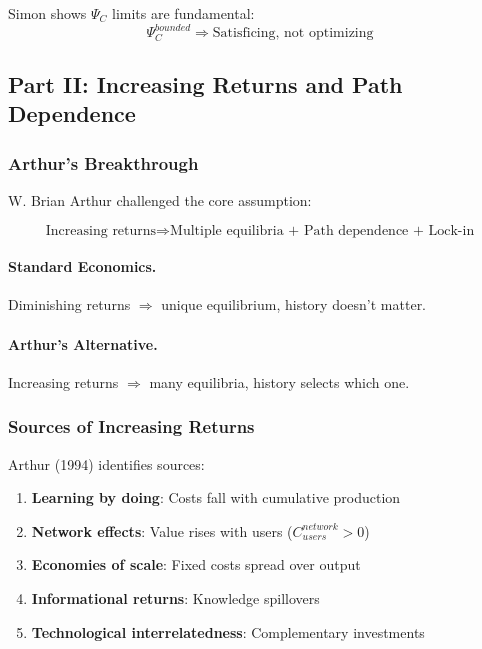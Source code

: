 Simon shows $\Psi_C$ limits are fundamental:
\begin{equation}
\Psi_C^{bounded} \Rightarrow \text{Satisficing, not optimizing}
\end{equation}

\subsection{Part II: Increasing Returns and Path Dependence}

\subsubsection{Arthur's Breakthrough}

W. Brian Arthur challenged the core assumption:

\begin{equation}
\boxed{
\text{Increasing returns} \Rightarrow \text{Multiple equilibria + Path dependence + Lock-in}
}
\label{eq:arthur-ir}
\end{equation}

\paragraph{Standard Economics.}
Diminishing returns $\Rightarrow$ unique equilibrium, history doesn't matter.

\paragraph{Arthur's Alternative.}
Increasing returns $\Rightarrow$ many equilibria, history selects which one.

\subsubsection{Sources of Increasing Returns}

Arthur (1994) identifies sources:
\begin{enumerate}
    \item \textbf{Learning by doing}: Costs fall with cumulative production
    \item \textbf{Network effects}: Value rises with users ($C_{users}^{network} > 0$)
    \item \textbf{Economies of scale}: Fixed costs spread over output
    \item \textbf{Informational returns}: Knowledge spillovers
    \item \textbf{Technological interrelatedness}: Complementary investments
\end{enumerate}

